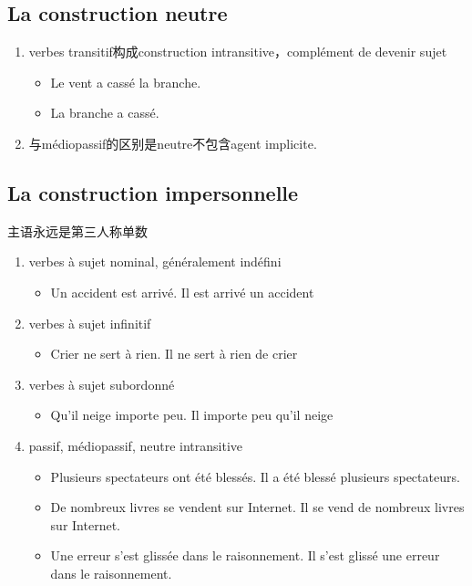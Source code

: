 \documentclass[UTF8]{report}
\begin{document}
\subsection{La construction neutre}

\begin{enumerate}
    \item verbes transitif构成construction intransitive，complément de devenir sujet
    \begin{itemize}
        \item Le vent a cassé la branche.
        \item La branche a cassé.
    \end{itemize}
    \item 与médiopassif的区别是neutre不包含agent implicite.
\end{enumerate}


\subsection{La construction impersonnelle}
主语永远是第三人称单数
\begin{enumerate}
    \item verbes à sujet nominal, généralement indéfini
    \begin{itemize}
        \item Un accident est arrivé. Il est arrivé un accident
    \end{itemize}
    \item verbes à sujet infinitif
    \begin{itemize}
        \item Crier ne sert à rien. Il ne sert à rien de crier
    \end{itemize}
    \item verbes à sujet subordonné
    \begin{itemize}
        \item Qu’il neige importe peu. Il importe peu qu’il neige
    \end{itemize}
    \item passif, médiopassif, neutre intransitive
    \begin{itemize}
        \item Plusieurs spectateurs ont été blessés. Il a été blessé plusieurs spectateurs.
        \item De nombreux livres se vendent sur Internet. Il se vend de nombreux livres sur Internet.
        \item Une erreur s’est glissée dans le raisonnement. Il s’est glissé une erreur dans le raisonnement.
    \end{itemize}
\end{enumerate}
\end{document}
